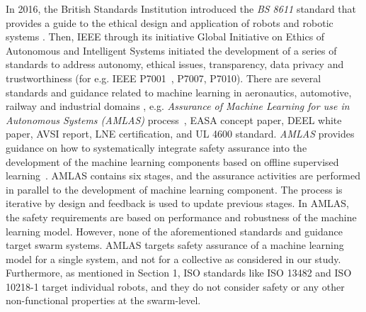 \documentclass[runningheads]{llncs}
\begin{document}
In 2016, the British Standards Institution introduced the \emph{BS 8611} standard that provides a guide to the ethical design and application of robots and robotic systems \cite{BS8611}. 
Then, IEEE through its initiative Global Initiative on Ethics of Autonomous and Intelligent Systems initiated the development of a series of standards to address autonomy, ethical issues, transparency, data privacy and trustworthiness (for e.g. IEEE P7001~\cite{IEEE-P7001}, P7007, P7010). 
There are several standards and guidance related to machine learning in aeronautics, automotive, railway and industrial domains \cite{Kaakai2022}, e.g. \emph{Assurance of Machine Learning for use in Autonomous Systems (AMLAS)} process~\cite{Hawkins2021}, EASA concept paper, DEEL white paper, AVSI report, LNE certification, and UL 4600 standard. 
\emph{AMLAS} provides guidance on how to systematically integrate safety assurance into the development of the machine learning components based on offline supervised learning~\cite{Hawkins2021}. 
AMLAS contains six stages, and the assurance activities are performed in parallel to the development of machine learning component. 
The process is iterative by design and feedback is used to update previous stages. 
In AMLAS, the safety requirements are based on performance and robustness of the machine learning model. 
However, none of the aforementioned standards and guidance target swarm systems. 
AMLAS targets safety assurance of a machine learning model for a single system, and not for a collective as considered in our study. 
Furthermore, as mentioned in Section 1, ISO standards like ISO 13482 and ISO 10218-1 target individual robots, and they do not consider safety or any other non-functional properties at the swarm-level.
\end{document}
